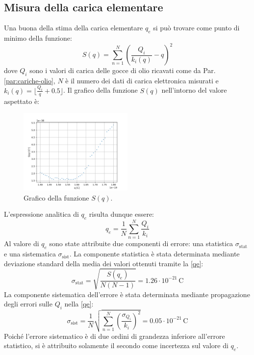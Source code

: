 \documentclass[]{article}
\let\oldsubsection\subsection%
\renewcommand{\subsection}{%
	\renewcommand{\theequation}{\thesubsection.\arabic{equation}}%
	\oldsubsection}%
\begin{document}
    \subsection{Misura della carica elementare}
    Una buona della stima della carica elementare $q_e$ si può trovare come punto di minimo della funzione:
    \begin{equation}
        \label{S-function}
        S(q) = \sum_{n=1}^{N} \left( \frac{Q_i}{k_i \left(q \right)} - q \right)^2
    \end{equation}
    dove $Q_i$ sono i valori di carica delle gocce di olio ricavati come da Par. \ref{par:cariche-olio}, $N$ è il numero dei dati di carica elettronica misurati e $k_i(q)=\lfloor\frac{Q_i}{q} + 0.5 \rfloor$.
    Il grafico della funzione $S(q)$ nell'intorno del valore aspettato è:
    \begin{figure}[H]
        \centering
        \includegraphics[width=0.50\textwidth]{analysis/graph.png}
        \caption{Grafico della funzione $S(q)$.}
        \label{graph}
    \end{figure}    
    L'espressione analitica di $q_e$ risulta dunque essere:
    \begin{equation}
        \label{qe}
        q_e = \frac{1}{N} \sum_{n=1}^{N} \frac{Q_i}{k_i}
    \end{equation}
    Al valore di $q_e$ sono state attribuite due componenti di errore: una statistica $\sigma_{\text{stat}}$ e una sistematica $\sigma_{\text{sist}}$. La componente statistica è stata determinata mediante deviazione standard della media dei valori ottenuti tramite la \ref{qe}:
    \begin{equation}
        \label{sigma-stat}
        \sigma_{\text{stat}} = \sqrt{ \frac{S(q_e)}{N \left(N-1 \right)} } = 1.26 \cdot 10^{-21} \, \text{C}
    \end{equation}
    La componente sistematica dell'errore è stata determinata mediante propagazione degli errori sulle $Q_i$ nella \ref{qe}:
    \begin{equation}
        \sigma_{\text{sist}} = \frac{1}{N} \sqrt{\sum_{n=1}^{N} \left(\frac{\sigma_{Q_i}}{k_i} \right)^2} = 0.05 \cdot 10^{-21} \, \text{C}
    \end{equation}
    Poiché l'errore sistematico è di due ordini di grandezza inferiore all'errore statistico, si è attribuito solamente il secondo come incertezza sul valore di $q_e$.
\end{document}
